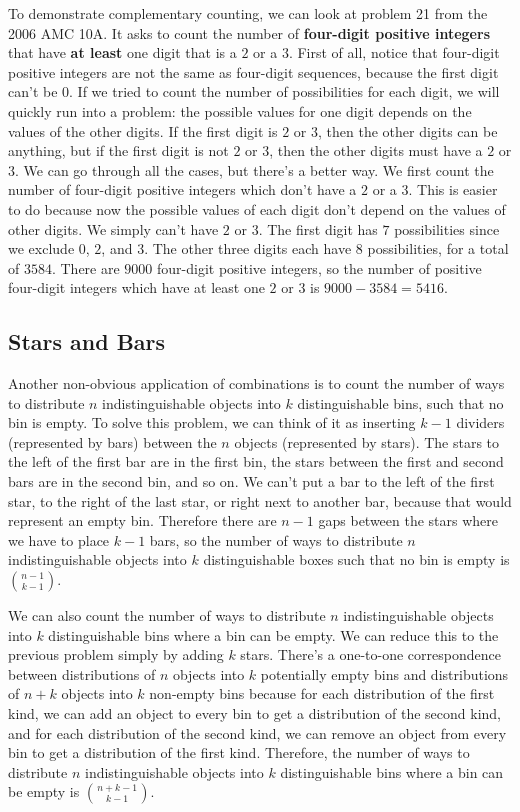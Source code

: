 \documentclass[twocolumn]{article}
\begin{document}
To demonstrate complementary counting, we can look at problem 21 from the 2006 AMC 10A.
It asks to count the number of \textbf{four-digit positive integers} that have \textbf{at least} one digit that is a $2$ or a $3$.
First of all, notice that four-digit positive integers are not the same as four-digit sequences, because the first digit can't be $0$.
If we tried to count the number of possibilities for each digit, we will quickly run into a problem: the possible values for one digit depends on the values of the other digits.
If the first digit is $2$ or $3$, then the other digits can be anything, but if the first digit is not $2$ or $3$, then the other digits must have a $2$ or $3$.
We can go through all the cases, but there's a better way.
We first count the number of four-digit positive integers which don't have a $2$ or a $3$.
This is easier to do because now the possible values of each digit don't depend on the values of other digits.
We simply can't have $2$ or $3$.
The first digit has $7$ possibilities since we exclude $0$, $2$, and $3$.
The other three digits each have $8$ possibilities, for a total of $3584$.
There are $9000$ four-digit positive integers, so the number of positive four-digit integers which have at least one $2$ or $3$ is $9000 - 3584 = 5416$.

\subsection*{Stars and Bars}
Another non-obvious application of combinations is to count the number of ways to distribute $n$ indistinguishable objects into $k$ distinguishable bins, such that no bin is empty.
To solve this problem, we can think of it as inserting $k - 1$ dividers (represented by bars) between the $n$ objects (represented by stars).
The stars to the left of the first bar are in the first bin, the stars between the first and second bars are in the second bin, and so on.
We can't put a bar to the left of the first star, to the right of the last star, or right next to another bar, because that would represent an empty bin.
Therefore there are $n - 1$ gaps between the stars where we have to place $k - 1$ bars, so the number of ways to distribute $n$ indistinguishable objects into $k$ distinguishable boxes such that no bin is empty is $\binom{n - 1}{k - 1}$.

We can also count the number of ways to distribute $n$ indistinguishable objects into $k$ distinguishable bins where a bin can be empty.
We can reduce this to the previous problem simply by adding $k$ stars.
There's a one-to-one correspondence between distributions of $n$ objects into $k$ potentially empty bins and distributions of $n + k$ objects into $k$ non-empty bins because for each distribution of the first kind, we can add an object to every bin to get a distribution of the second kind, and for each distribution of the second kind, we can remove an object from every bin to get a distribution of the first kind.
Therefore, the number of ways to distribute $n$ indistinguishable objects into $k$ distinguishable bins where a bin can be empty is $\binom{n + k - 1}{k - 1}$.
\end{document}
